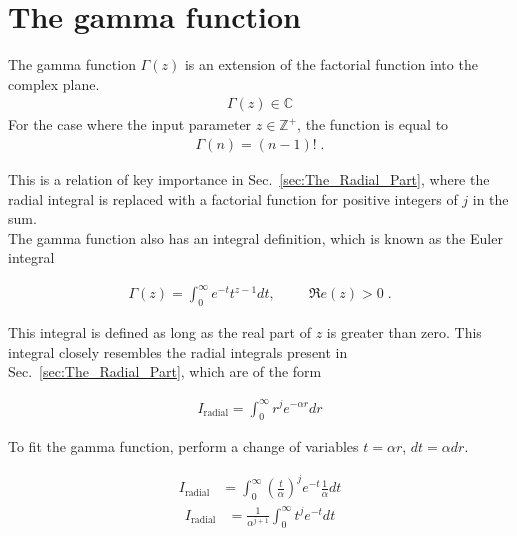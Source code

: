     \section{The gamma function} \label{sec:Gamma_Function}
        The gamma function $\Gamma(z)$ is an extension of the factorial function into the complex plane. 
        \begin{align}
            \Gamma(z) \in \mathbb{C} 
        \end{align}
        For the case where the input parameter $z \in \mathbb{Z}^+$, the function is equal to \cite{Arfken_Weber_Arfken_Weber_2008}
        \begin{align}
            \Gamma(n) = (n - 1)!\;.
        \end{align}

        \noindent This is a relation of key importance in Sec.~\ref{sec:The_Radial_Part}, where the radial integral is replaced with a factorial function for positive integers of $j$ in the sum.\\

        The gamma function also has an integral definition, which is known as the Euler integral

        \begin{align}
            \Gamma(z) = \int_0^\infty e^{-t} t^{z-1} dt, \hspace{1cm} \mathfrak{R}e(z) > 0\;.
        \end{align}

        \noindent This integral is defined as long as the real part of $z$ is greater than zero. This integral closely resembles the radial integrals present in Sec.~\ref{sec:The_Radial_Part}, which are of the form

        \begin{align}
            I_{\text{radial}} = \int_0^\infty r^j e^{-\alpha r} dr
        \end{align}

        \noindent To fit the gamma function, perform a change of variables $t = \alpha r$, $dt = \alpha dr$.

        \begin{align}
            I_{\text{radial}} &= \int_0^\infty \left( \frac{t}{\alpha} \right)^j e^{-t} \frac{1}{\alpha} dt
        \end{align}
        \begin{align}
            I_{\text{radial}} &= \frac{1}{\alpha^{j+1}}\int_0^\infty {t}^j e^{-t} dt
        \end{align}

